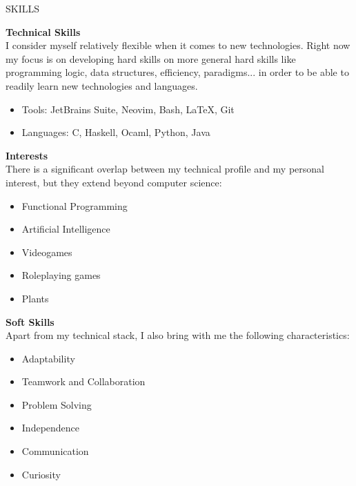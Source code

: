 \documentclass [10pt, a4paper] {extarticle}
\newcommand{\sectionlinethickness}{
    1.3 pt
}
\newcommand{\leftcolumwidth}{
    0.18
}
\newcommand{\rightcolumwidth}{
    0.82
}
\newcommand {\sectiontitle}[1] {
    \begin {flushleft}
    \begin {minipage}[c]{\leftcolumwidth\textwidth}
        \begin {flushright}
        \!\MakeUppercase {#1}
        \hspace* {10px}
        \end {flushright}
    \end {minipage}
        \begin {tikzpicture}
            \hspace{-4px}
            \draw [line width=\sectionlinethickness, namelines] (1,0) -- (15.363,0);
        \end {tikzpicture}
    \end {flushleft}
}
\begin{document}

    \sectiontitle {skills}

    \begin {flushright}
    \begin {minipage} [t] {\rightcolumwidth\textwidth}

        \textbf {Technical Skills} \\ [4px]
        I consider myself relatively flexible when it comes to new technologies. Right now my focus is on developing hard skills on more general hard skills like programming logic, data structures, efficiency, paradigms... in order to be able to readily learn new technologies and languages.
        \vspace {-2px}
        \begin {itemize} [noitemsep]
            \item Tools: JetBrains Suite, Neovim, Bash, LaTeX, Git
            \item Languages: C, Haskell, Ocaml, Python, Java
        \end {itemize}

        \begin {minipage} [t] {0.475\textwidth}
            \textbf {Interests} \\ [4px]
            There is a significant overlap between my technical profile and my personal interest, but they extend beyond computer science:
            \vspace {-2px}
            \begin {itemize} [noitemsep]
                \item Functional Programming
                \item Artificial Intelligence
                \item Videogames
                \item Roleplaying games
                \item Plants
            \end {itemize}
        \end {minipage}
        \hfill
        \begin {minipage} [t] {0.475\textwidth}
            \textbf {Soft Skills} \\ [4px]
            Apart from my technical stack, I also bring with me the following characteristics:
            \vspace {-2px}
            \begin {itemize} [noitemsep]
                \item Adaptability
                \item Teamwork and Collaboration
                \item Problem Solving
                \item Independence
                \item Communication
                \item Curiosity
            \end {itemize}
        \end {minipage}
    \end {minipage}
    \end {flushright}
\end{document}
